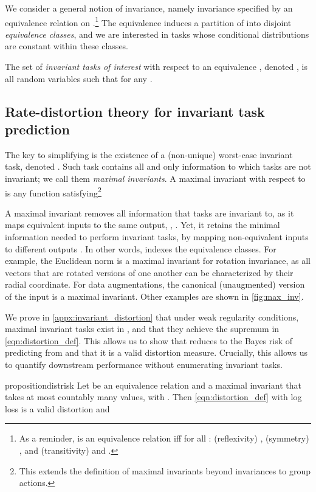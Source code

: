 \documentclass[final]{article}
\begin{document}
We consider a general notion of invariance, namely invariance specified by an equivalence relation  on .\footnote{As a reminder,  is an equivalence relation iff for all : (reflexivity) , (symmetry) , and (transitivity)  and .
}
 The equivalence induces a partition of  into disjoint \textit{equivalence classes}, and we are interested in  tasks whose conditional distributions are constant within these classes.
\begin{definition} \label{def:invariant_tasks_interest:main}
The set of \textit{invariant tasks of interest} with respect to an  equivalence , denoted , is all random variables  such that  for any . 
\end{definition}



\subsection{Rate-distortion theory for invariant task prediction} 

The key to simplifying \disttextinv{} is the existence of a (non-unique) worst-case invariant task, denoted .
Such task contains all and only information to which tasks  are not invariant; we call them \textit{maximal invariants}.
A maximal invariant  with respect to  is any function satisfying\footnote{
This extends the definition of maximal invariants \cite{eaton_group_1989} beyond invariances to group actions.
}

A maximal invariant removes all information that tasks are invariant to, as it maps equivalent
inputs to the same output, \ie, .
Yet, it retains the minimal information needed to perform invariant tasks, by mapping non-equivalent inputs  to different outputs .
In other words,  indexes the equivalence classes. 
For example, the Euclidean norm is a maximal invariant for rotation invariance, as all vectors that are rotated versions of one another can be characterized by their radial coordinate. 
For data augmentations, the canonical (unaugmented) version of the input is a maximal invariant. Other examples are shown in  \cref{fig:max_inv}.

We prove in \cref{appx:invariant_distortion} that under weak regularity conditions, maximal invariant tasks exist in , and that they achieve the supremum in \cref{eqn:distortion_def}.
This allows us to show that \disttextinv{} reduces to the Bayes risk of predicting  from  and that it is a valid distortion measure. Crucially, this allows us to quantify downstream performance without enumerating invariant tasks.
\begin{restatable}{proposition}{distrisk}
\label{prop:nicer_dist}
Let  be an equivalence relation and  a maximal invariant that takes at most countably many values, with .
Then \disttextinv{} \eqref{eqn:distortion_def} with log loss is a valid distortion and

\end{restatable}
\end{document}
